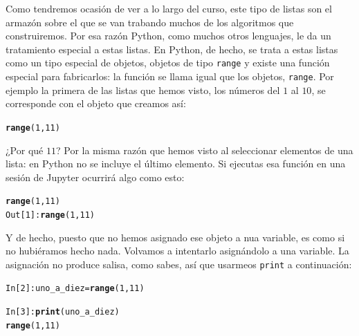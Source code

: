 \documentclass[10pt,a4paper]{article}\usepackage[]{graphicx}\usepackage[]{color}
\makeatletter
\newcommand{\hlnum}[1]{\textcolor[rgb]{0.686,0.059,0.569}{#1}}%
\newcommand{\hlopt}[1]{\textcolor[rgb]{0,0,0}{#1}}%
\newcommand{\hlstd}[1]{\textcolor[rgb]{0.345,0.345,0.345}{#1}}%
\newcommand{\hlkwb}[1]{\textcolor[rgb]{0.69,0.353,0.396}{#1}}%
\newcommand{\hlkwd}[1]{\textcolor[rgb]{0.737,0.353,0.396}{\textbf{#1}}}%
\newenvironment{kframe}{%
 \def\at@end@of@kframe{}%
 \ifinner\ifhmode%
  \def\at@end@of@kframe{\end{minipage}}%
  \begin{minipage}{\columnwidth}%
 \fi\fi%
 \def\FrameCommand##1{\hskip\@totalleftmargin \hskip-\fboxsep
 \colorbox{shadecolor}{##1}\hskip-\fboxsep
     \hskip-\linewidth \hskip-\@totalleftmargin \hskip\columnwidth}%
 \MakeFramed {\advance\hsize-\width
   \@totalleftmargin\z@ \linewidth\hsize
   \@setminipage}}%
 {\par\unskip\endMakeFramed%
 \at@end@of@kframe}
\newenvironment{knitrout}{}{} %
\newcounter {cont01}
\makeatother
\begin{document}
Como tendremos ocasión de ver a lo largo del curso, este tipo de listas son el armazón sobre el que se van trabando muchos de los algoritmos que construiremos. Por esa razón Python, como muchos otros lenguajes, le da un tratamiento especial a estas listas. En Python, de hecho, se trata a estas listas como un tipo especial de objetos, objetos de tipo {\tt range} y existe una función especial para fabricarlos: la función se llama igual que los objetos, {\tt range}. Por ejemplo la primera de las listas que hemos visto, los números del $1$ al $10$, se corresponde con el objeto que creamos así:
\begin{knitrout}
\color{fgcolor}\begin{kframe}
\begin{alltt}
\hlkwd{range}\hlstd{(}\hlnum{1}\hlstd{,} \hlnum{11}\hlstd{)}
\end{alltt}
\end{kframe}
\end{knitrout}
¿Por qué $11$? Por la misma razón que hemos visto al seleccionar elementos de una lista: en Python no se incluye el último elemento. Si ejecutas esa función en una sesión de Jupyter ocurrirá algo como esto:
\begin{knitrout}
\color{fgcolor}\begin{kframe}
\begin{alltt}
\hlkwd{range}\hlstd{(}\hlnum{1}\hlstd{,} \hlnum{11}\hlstd{)}
\hlstd{Out[}\hlnum{1}\hlstd{]}\hlopt{:} \hlkwd{range}\hlstd{(}\hlnum{1}\hlstd{,} \hlnum{11}\hlstd{)}
\end{alltt}
\end{kframe}
\end{knitrout}
Y de hecho, puesto que no hemos asignado ese objeto a nua variable, es como si no hubiéramos hecho nada. Volvamos a intentarlo asignándolo a una variable. La asignación no produce salisa, como sabes, así que usarmeos {\tt print} a continuación:
\begin{knitrout}
\color{fgcolor}\begin{kframe}
\begin{alltt}
\hlstd{In [}\hlnum{2}\hlstd{]}\hlopt{:} \hlstd{uno_a_diez} \hlkwb{=} \hlkwd{range}\hlstd{(}\hlnum{1}\hlstd{,} \hlnum{11}\hlstd{)}

\hlstd{In [}\hlnum{3}\hlstd{]}\hlopt{:} \hlkwd{print}\hlstd{(uno_a_diez)}
\hlkwd{range}\hlstd{(}\hlnum{1}\hlstd{,} \hlnum{11}\hlstd{)}
\end{alltt}
\end{kframe}
\end{knitrout}
\end{document}
